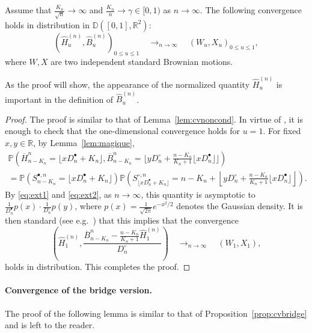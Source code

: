 \documentclass[10pt]{amsart}
\theoremstyle{definition}\newtheorem{defi}[theo]{Definition}\newtheorem{rema}[theo]{Remark}\newtheorem{exam}[theo]{Example}\newtheorem{exem}[theo]{Example}\newtheorem{nota}[theo]{Notation}
\newcommand{\R}{\mathbb{R}}
\def\Sbn{S^{\bullet,n}}
\def\Scn{S^{\circ,n}}
\def\Dbn{D^{\bullet}_{n}}
\def\Dcn{D^{\circ}_{n}}
\def\oB{\overline{B}}
\def\hB{\widehat{B}}
\def\oH{\overline{H}}
\def\hH{\widehat{H}}
\renewcommand\Pr[1]{\mathbb{P}\left(#1\right)}
\begin{document}
   \begin{lemma} Assume that $\frac{K_{n}}{\sqrt{n}} \rightarrow   \infty$ and   $\tfrac{K_{n}}{n}  \rightarrow \gamma \in [0,1)$ as $n \rightarrow \infty$.
  The following convergence holds in distribution in $\mathbb{D}([0,1],\R^{2})$:
  \[ \left( \hH^{(n)}_{u} ,  \hB^{(n)}_{u} \right)_{0 \leq u \leq 1}  \quad \mathop{\longrightarrow}_{n \rightarrow \infty} \quad  (W_{u},X_{u})_{0 \leq u \leq 1},\]
 where  $W,X$ are two independent standard Brownian motions.
  \end{lemma}

As the proof will show, the appearance of the normalized quantity $\hH^{(n)}_{u}$ is important in the definition of $\hB^{(n)}_{u}$.

\begin{proof}
The proof is similar to that of Lemma~\ref{lem:cvnoncond}. In virtue of \cite[Theorem 16.14]{Kal02}, it is enough to check that the one-dimensional convergence holds for $u=1$.  For fixed $x,y \in \R$, by Lemma~\ref{lem:magique},
\begin{multline*}
\Pr{\oH^{n}_{  n-K_{n} }= \lfloor x \Dbn+K_{n} \rfloor ,\oB^{n}_{  n-K_{n}}= \lfloor y  \Dcn + \frac{n-K_{n}}{K_{n}+1} \lfloor x \Dbn \rfloor \rfloor} \\
=\Pr{\Sbn_{ n-K_{n} }=  \lfloor x \Dbn +K_{n} \rfloor} \Pr{\Scn_{ \lfloor x \Dbn +K_{n} \rfloor }= n-K_{n}   + \left\lfloor  y  \Dcn + \frac{n-K_{n}}{K_{n}+1} \lfloor x \Dbn \rfloor \right\rfloor}.
\end{multline*}
By \eqref{eq:ext1} and \eqref{eq:ext2}, as $n \rightarrow \infty$, this quantity is asymptotic to $ \tfrac{1}{ \Dbn  }    p (x)  \cdot  \tfrac{1}{\Dcn} p (y)$,
where $p(x)= \tfrac{1}{\sqrt{2\pi}} e^{- {x^{2}}/{2}}$ denotes the Gaussian density.
It is then standard (see e.g.~\cite[Theorem 7.8]{Bil68}) that this implies that the convergence
  \[ \left( \hH^{(n)}_{1} ,  \frac{\oB^{n}_{ n-K_{n} }  - \frac{n-K_{n}}{K_{n}+1} \hH^{(n)}_{1}  }{\Dcn} \right)  \quad \mathop{\longrightarrow}_{n \rightarrow \infty} \quad  (W_{1},X_{1}),\]
  holds in distribution. This completes the proof.
  \end{proof}

\paragraph*{Convergence of the bridge version.} The proof of the following lemma is similar to that of Proposition~\ref{prop:cvbridge} and is left to the reader.
\end{document}
